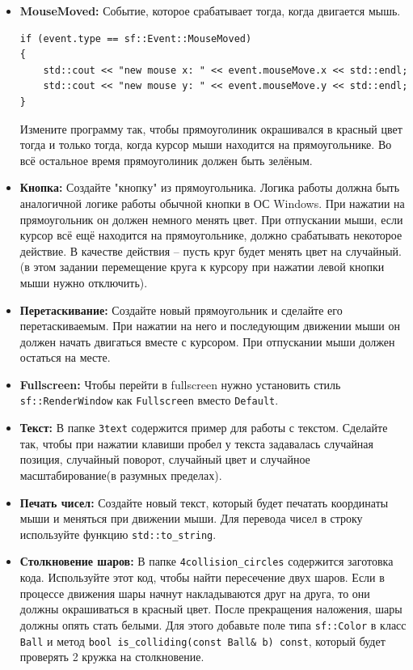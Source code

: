 \documentclass{article}
\begin{document}
\begin{itemize}
\item \textbf{MouseMoved:} Событие, которое срабатывает тогда, когда двигается мышь.
\begin{lstlisting}
if (event.type == sf::Event::MouseMoved)
{
    std::cout << "new mouse x: " << event.mouseMove.x << std::endl;
    std::cout << "new mouse y: " << event.mouseMove.y << std::endl;
}
\end{lstlisting}
Измените программу так, чтобы прямоуголиник окрашивался в красный цвет тогда и только тогда, когда курсор мыши находится на прямоугольнике. Во всё остальное время прямоуголиник должен быть зелёным.
\item \textbf{Кнопка:} Создайте "кнопку" из прямоугольника. Логика работы должна быть аналогичной логике работы обычной кнопки в ОС Windows. При нажатии на прямоугольник он должен немного менять цвет. При отпускании мыши, если курсор всё ещё находится на прямоугольнике, должно срабатывать некоторое действие. В качестве действия -- пусть круг будет менять цвет на случайный. (в этом задании перемещение круга к курсору при нажатии левой кнопки мыши нужно отключить).
\item \textbf{Перетаскивание:} Создайте новый прямоугольник и сделайте его перетаскиваемым. При нажатии на него и последующим движении мыши он должен начать двигаться вместе с курсором. При отпускании мыши должен остаться на месте.
\item \textbf{Fullscreen:} Чтобы перейти в fullscreen нужно установить стиль \texttt{sf::RenderWindow} как \texttt{Fullscreen} вместо \texttt{Default}.
\item \textbf{Текст:} В папке \texttt{3text} содержится пример для работы с текстом. Сделайте так, чтобы при нажатии клавиши пробел у текста задавалась случайная позиция, случайный поворот, случайный цвет и случайное масштабирование(в разумных пределах).
\item \textbf{Печать чисел:} Создайте новый текст, который будет печатать координаты мыши и меняться при движении мыши. Для перевода чисел в строку используйте функцию \texttt{std::to\_string}.
\item \textbf{Столкновение шаров:} В папке \texttt{4collision\_circles} содержится заготовка кода. Используйте этот код, чтобы найти пересечение двух шаров. Если в процессе движения шары начнут накладываются друг на друга, то они должны окрашиваться в красный цвет. После прекращения наложения, шары должны опять стать белыми. Для этого добавьте поле типа \texttt{sf::Color} в класс \texttt{Ball} и метод \texttt{bool is\_colliding(const Ball\& b) const}, который будет проверять 2 кружка на столкновение.

\end{itemize}
\end{document}
